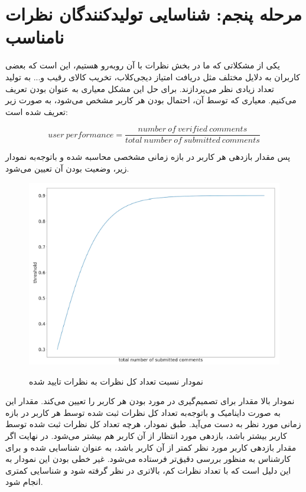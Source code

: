 \section{مرحله پنجم: شناسایی تولیدکنندگان نظرات نامناسب}
یکی از مشکلاتی که ما در بخش نظرات با آن روبه‌رو هستیم، این است که بعضی کاربران به دلایل مختلف مثل دریافت امتیاز دیجی‌کلاب، تخریب کالای رقیب و... به تولید تعداد زیادی نظر می‌پردازند. برای حل این مشکل معیاری به عنوان  بودن تعریف می‌کنیم.
معیاری که توسط آن، احتمال  بودن هر کاربر مشخص می‌شود، به صورت زیر تعریف شده است:

\begin{equation}
user \: performance = \dfrac{number \: of \: verified \: comments}{total \: number \: of \: submitted \: comments}
\end{equation}

پس مقدار بازدهی هر کاربر در بازه زمانی مشخصی محاسبه شده و باتوجه‌به نمودار زیر، وضعیت   بودن آن تعیین می‌شود.


\begin{figure}[H]
\centering
\caption{نمودار نسبت تعداد کل نظرات به نظرات تایید شده}\label{}
\includegraphics[width=15cm]{figs/spammer.png}
\label{fig:test}
\end{figure}

نمودار بالا مقدار  برای تصمیم‌گیری در مورد  بودن هر کاربر را تعیین می‌کند. مقدار این  به صورت داینامیک و باتوجه‌به تعداد کل نظرات ثبت شده توسط هر کاربر در بازه زمانی مورد نظر به دست می‌آید. 
طبق نمودار، هرچه تعداد کل نظرات ثبت شده توسط کاربر بیشتر باشد، بازدهی مورد انتظار از آن کاربر هم بیشتر می‌شود. در نهایت اگر مقدار بازدهی کاربر مورد نظر کمتر از  آن کاربر باشد، به عنوان  شناسایی شده و برای کارشناس به منظور بررسی دقیق‌تر فرستاده می‌شود. 
غیر خطی بودن این نمودار به این دلیل است که با تعداد نظرات کم،  بالاتری در نظر گرفته‌ شود و شناسایی کمتری انجام شود.



